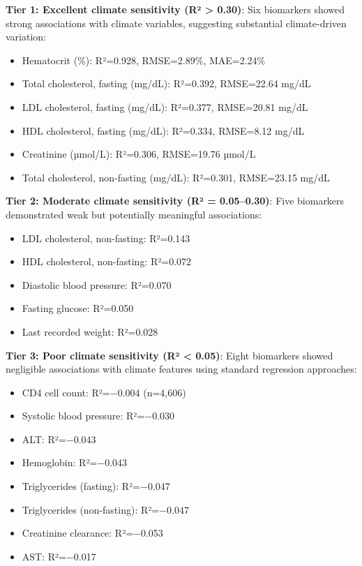 \textbf{Tier 1: Excellent climate sensitivity (R² > 0.30)}: Six biomarkers showed strong associations with climate variables, suggesting substantial climate-driven variation:
\begin{itemize}
    \item Hematocrit (\%): R²=0.928, RMSE=2.89\%, MAE=2.24\%
    \item Total cholesterol, fasting (mg/dL): R²=0.392, RMSE=22.64 mg/dL
    \item LDL cholesterol, fasting (mg/dL): R²=0.377, RMSE=20.81 mg/dL
    \item HDL cholesterol, fasting (mg/dL): R²=0.334, RMSE=8.12 mg/dL
    \item Creatinine (µmol/L): R²=0.306, RMSE=19.76 µmol/L
    \item Total cholesterol, non-fasting (mg/dL): R²=0.301, RMSE=23.15 mg/dL
\end{itemize}

\textbf{Tier 2: Moderate climate sensitivity (R² = 0.05--0.30)}: Five biomarkers demonstrated weak but potentially meaningful associations:
\begin{itemize}
    \item LDL cholesterol, non-fasting: R²=0.143
    \item HDL cholesterol, non-fasting: R²=0.072
    \item Diastolic blood pressure: R²=0.070
    \item Fasting glucose: R²=0.050
    \item Last recorded weight: R²=0.028
\end{itemize}

\textbf{Tier 3: Poor climate sensitivity (R² < 0.05)}: Eight biomarkers showed negligible associations with climate features using standard regression approaches:
\begin{itemize}
    \item CD4 cell count: R²=−0.004 (n=4,606)
    \item Systolic blood pressure: R²=−0.030
    \item ALT: R²=−0.043
    \item Hemoglobin: R²=−0.043
    \item Triglycerides (fasting): R²=−0.047
    \item Triglycerides (non-fasting): R²=−0.047
    \item Creatinine clearance: R²=−0.053
    \item AST: R²=−0.017
\end{itemize}

